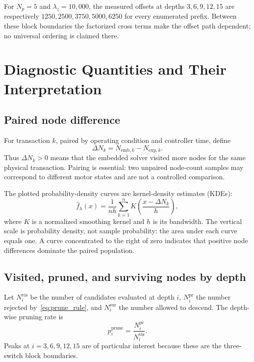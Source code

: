 \documentclass[paper=a4,oneside,fontsize=12pt,DIV=14,headings=normal,parskip=half,headsepline,numbers=noendperiod]{scrreprt}
\begin{document}
For $N_p=5$ and $\lambda_z=10{,}000$, the measured offsets at depths
$3,6,9,12,15$ are respectively $1250,2500,3750,5000,6250$ for every enumerated
prefix.  Between these block boundaries the factorized cross terms make the
offset path dependent; no universal ordering is claimed there.

\chapter{Diagnostic Quantities and Their Interpretation}

\section{Paired node difference}
For transaction $k$, paired by operating condition and controller time, define
\begin{equation}
 \Delta N_k=N_{\mathrm{emb},k}-N_{\mathrm{exp},k}.
\end{equation}
Thus $\Delta N_k>0$ means that the embedded solver visited more nodes for the
same physical transaction.  Pairing is essential: two unpaired node-count
samples may correspond to different motor states and are not a controlled
comparison.

The plotted probability-density curves are kernel-density estimates (KDEs):
\begin{equation}
 \widehat f_h(x)=\frac{1}{n h}\sum_{k=1}^{n}
 K\!\left(\frac{x-\Delta N_k}{h}\right),
\end{equation}
where $K$ is a normalized smoothing kernel and $h$ is its bandwidth.  The
vertical scale is probability density, not sample probability: the area under
each curve equals one.  A curve concentrated to the right of zero indicates
that positive node differences dominate the paired population.

\section{Visited, pruned, and surviving nodes by depth}
Let $N_i^{\mathrm{vis}}$ be the number of candidates evaluated at depth $i$,
$N_i^{\mathrm{pr}}$ the number rejected by~\eqref{eq:prune_rule}, and
$N_i^{\mathrm{sur}}$ the number allowed to descend.  The depth-wise pruning
rate is
\begin{equation}
 p_i^{\mathrm{prune}}=\frac{N_i^{\mathrm{pr}}}{N_i^{\mathrm{vis}}}.
\end{equation}
Peaks at $i=3,6,9,12,15$ are of particular interest because these are the
three-switch block boundaries.
\end{document}
